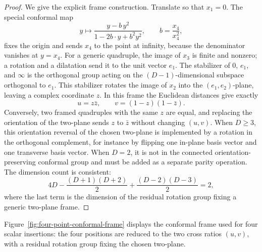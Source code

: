 \begin{proof}
We give the explicit frame construction.  Translate so that \(x_1=0\).  The
special conformal map
\[
  y\longmapsto
  \frac{y-b\,y^2}{1-2b\cdot y+b^2y^2},
  \qquad
  b=\frac{x_4}{x_4^2},
\]
fixes the origin and sends \(x_4\) to the point at infinity, because the
denominator vanishes at \(y=x_4\).  For a generic quadruple, the image of
\(x_3\) is finite and nonzero; a rotation and a dilatation send it to the unit
vector \(e_1\).  The stabilizer of \(0\), \(e_1\), and \(\infty\) is the
orthogonal group acting on the \((D-1)\)-dimensional subspace orthogonal to
\(e_1\).  This stabilizer rotates the image of \(x_2\) into the
\((e_1,e_2)\)-plane, leaving a complex coordinate \(z\).  In this frame the
Euclidean distances give exactly
\[
  u=z\bar z,\qquad v=(1-z)(1-\bar z).
\]
Conversely, two framed quadruples with the same \(z\) are equal, and replacing
the orientation of the two-plane sends \(z\) to \(\bar z\) without changing
\((u,v)\).  When \(D\ge3\), this orientation reversal of the chosen two-plane
is implemented by a rotation in the orthogonal complement, for instance by
flipping one in-plane basis vector and one transverse basis vector.  When
\(D=2\), it is not in the connected orientation-preserving conformal group and
must be added as a separate parity operation.  The dimension count is
consistent:
\[
  4D-\frac{(D+1)(D+2)}2+\frac{(D-2)(D-3)}2=2,
\]
where the last term is the dimension of the residual rotation group fixing a
generic two-plane frame.
\end{proof}

Figure~\ref{fig:four-point-conformal-frame} displays the conformal frame used
for four scalar insertions: the four positions are reduced to the two cross
ratios \((u,v)\), with a residual rotation group fixing the chosen two-plane.

